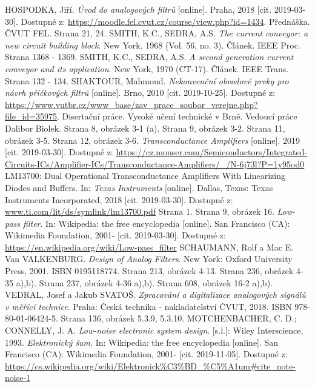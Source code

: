 \begin{thebibliography}{999}
HOSPODKA, Jiří. \textit{Úvod do analogových filtrů} [online]. Praha, 2018 [cit. 2019-03-30]. Dostupné z: \url{https://moodle.fel.cvut.cz/course/view.php?id=1434}. Přednáška. ČVUT FEL. Strana 21, 24.
SMITH, K.C., SEDRA, A.S. \textit{The current conveyor: a new circuit building block}. New York, 1968 (Vol. 56, no. 3). Článek. IEEE Proc. Strana 1368 - 1369.
SMITH, K.C., SEDRA, A.S. \textit{A second generation current conveyor and its application}. New York, 1970 (CT-17). Článek. IEEE Trans. Strana 132 - 134.
SHAKTOUR, Mahmoud. \textit{Nekonvenční obvodové prvky pro návrh příčkových filtrů} [online]. Brno, 2010 [cit. 2019-10-25]. Dostupné z: \url{https://www.vutbr.cz/www_base/zav_prace_soubor_verejne.php?file_id=35975}. Disertační práce. Vysoké učení technické v Brně. Vedoucí práce Dalibor Biolek. Strana 8, obrázek 3-1 (a). Strana 9, obrázek 3-2. Strana 11, obrázek 3-5. Strana 12, obrázek 3-6.
\textit{Transconductance Amplifiers} [online]. 2019 [cit. 2019-03-30]. Dostupné z: \url{https://cz.mouser.com/Semiconductors/Integrated-Circuits-ICs/Amplifier-ICs/Transconductance-Amplifiers/_/N-6j73l?P=1y95od0}
LM13700: Dual Operational Transconductance Amplifiers With Linearizing Diodes and Buffers. In: \textit{Texas Instruments} [online]. Dallas, Texas: Texas Instruments Incorporated, 2018 [cit. 2019-03-30]. Dostupné z: \url{www.ti.com/lit/ds/symlink/lm13700.pdf} Strana 1. Strana 9, obrázek 16.
\textit{Low-pass filter}. In: Wikipedia: the free encyclopedia [online]. San Francisco (CA): Wikimedia Foundation, 2001- [cit. 2019-03-30]. Dostupné z: \url{https://en.wikipedia.org/wiki/Low-pass_filter}
SCHAUMANN, Rolf a Mac E. Van VALKENBURG. \textit{Design of Analog Filters}. New York: Oxford University Press, 2001. ISBN 0195118774. Strana 213, obrázek 4-13. Strana 236, obrázek 4-35 a),b). Strana 237, obrázek 4-36 a),b). Strana 608, obrázek 16-2 a),b).
VEDRAL, Josef a Jakub SVATOŠ. \textit{Zpracování a digitalizace analogových signálů v měřící technice}. Praha: Česká technika - nakladatelství ČVUT, 2018. ISBN 978-80-01-06424-5. Strana 136, obrázek 5.3.9, 5.3.10.
MOTCHENBACHER, C. D.; CONNELLY, J. A. \textit{Low-noise electronic system design}. [s.l.]: Wiley Interscience, 1993.
\textit{Elektronický šum}. In: Wikipedia: the free encyclopedia [online]. San Francisco (CA): Wikimedia Foundation, 2001- [cit. 2019-11-05]. Dostupné z: \url{https://cs.wikipedia.org/wiki/Elektronick%C3%BD_%C5%A1um#cite_note-noise-1}
\end{thebibliography}